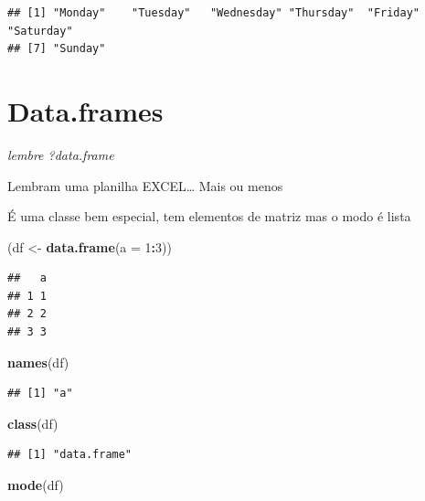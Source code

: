 \documentclass[]{book}
\newenvironment{Shaded}{\begin{snugshade}}{\end{snugshade}}
\newcommand{\KeywordTok}[1]{\textcolor[rgb]{0.13,0.29,0.53}{\textbf{#1}}}
\newcommand{\DataTypeTok}[1]{\textcolor[rgb]{0.13,0.29,0.53}{#1}}
\newcommand{\DecValTok}[1]{\textcolor[rgb]{0.00,0.00,0.81}{#1}}
\newcommand{\StringTok}[1]{\textcolor[rgb]{0.31,0.60,0.02}{#1}}
\newcommand{\OperatorTok}[1]{\textcolor[rgb]{0.81,0.36,0.00}{\textbf{#1}}}
\newcommand{\NormalTok}[1]{#1}
\begin{document}
\begin{verbatim}
## [1] "Monday"    "Tuesday"   "Wednesday" "Thursday"  "Friday"    "Saturday" 
## [7] "Sunday"
\end{verbatim}

\section{Data.frames}\label{data.frames}

\emph{lembre ?data.frame}

Lembram uma planilha EXCEL\ldots{} Mais ou menos

É uma classe bem especial, tem elementos de matriz mas o modo é lista

\begin{Shaded}
\begin{Highlighting}[]
\NormalTok{(df <-}\StringTok{ }\KeywordTok{data.frame}\NormalTok{(}\DataTypeTok{a =} \DecValTok{1}\OperatorTok{:}\DecValTok{3}\NormalTok{))}
\end{Highlighting}
\end{Shaded}

\begin{verbatim}
##   a
## 1 1
## 2 2
## 3 3
\end{verbatim}

\begin{Shaded}
\begin{Highlighting}[]
\KeywordTok{names}\NormalTok{(df)}
\end{Highlighting}
\end{Shaded}

\begin{verbatim}
## [1] "a"
\end{verbatim}

\begin{Shaded}
\begin{Highlighting}[]
\KeywordTok{class}\NormalTok{(df)}
\end{Highlighting}
\end{Shaded}

\begin{verbatim}
## [1] "data.frame"
\end{verbatim}

\begin{Shaded}
\begin{Highlighting}[]
\KeywordTok{mode}\NormalTok{(df)}
\end{Highlighting}
\end{Shaded}
\end{document}
